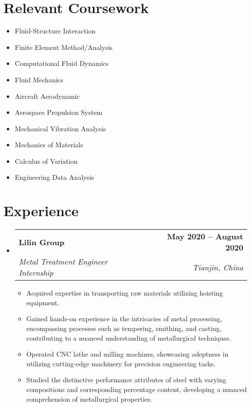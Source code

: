 \documentclass[letterpaper,11pt]{article}
\makeatletter
\newcommand{\resumeItem}[1]{
  \item\small{
    {#1 \vspace{-2pt}}
  }
}
\newcommand{\resumeSubheading}[4]{
  \vspace{-2pt}\item
    \begin{tabular*}{1.0\textwidth}[t]{l@{\extracolsep{\fill}}r}
      \textbf{#1} & \textbf{\small #2} \\
      \textit{\small#3} & \textit{\small #4} \\
    \end{tabular*}\vspace{-7pt}
}
\newcommand{\resumeSubHeadingListStart}{\begin{itemize}[leftmargin=0.0in, label={}]}
\newcommand{\resumeSubHeadingListEnd}{\end{itemize}}
\newcommand{\resumeItemListStart}{\begin{itemize}}
\newcommand{\resumeItemListEnd}{\end{itemize}\vspace{-5pt}}
\makeatother
\begin{document}
\section{Relevant Coursework}
        \begin{multicols}{4}
            \begin{itemize}[itemsep=-5pt, parsep=3pt]
                \item Fluid-Structure Interaction
                \item Finite Element Method/Analysis
                \item Computational Fluid Dynamics
                \item Fluid Mechanics
                \item Aircraft Aerodynamic
                \item Aerospace Propulsion System
                \item Mechanical Vibration Analysis
                \item Mechanics of Materials
                \item Calculus of Variation
                \item Engineering Data Analysis
            \end{itemize}
        \end{multicols}
        \vspace*{2.0\multicolsep}


\section{Experience}
  \resumeSubHeadingListStart
    \resumeSubheading
      {Lilin Group }{May 2020 -- August 2020}
      {Metal Treatment Engineer Internship}{Tianjin, China}
      \resumeItemListStart
        \resumeItem{Acquired expertise in transporting raw materials utilizing hoisting equipment.}
        \resumeItem{Gained hands-on experience in the intricacies of metal processing, encompassing processes such as tempering, smithing, and casting, contributing to a nuanced understanding of metallurgical techniques.}
        \resumeItem{Operated CNC lathe and milling machines, showcasing adeptness in utilizing cutting-edge machinery for precision engineering tasks.}
        \resumeItem{Studied the distinctive performance attributes of steel with varying compositions and corresponding percentage content, developing a nuanced comprehension of metallurgical properties.}
      \resumeItemListEnd
  \resumeSubHeadingListEnd
\vspace{-15pt}
\end{document}
